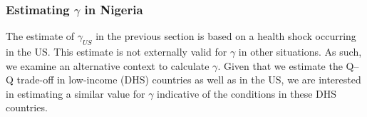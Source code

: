 \documentclass[subeqn]{article}
\begin{document}
\begin{spacing}{1.4}







\subsubsection{Estimating $\gamma$ in Nigeria}
\label{sscn:Nigeriagamma}
The estimate of $\gamma_{US}$ in the previous section is based on a health shock
occurring in the US.  This estimate is not externally valid for $\gamma$ in other
situations.  As such, we examine an alternative context to calculate $\gamma$.
Given that we estimate the Q--Q trade-off in low-income (DHS) countries as well
as in the US, we are interested in estimating a similar value for $\gamma$
indicative of the conditions in these DHS countries.


\end{spacing}
\end{document}

